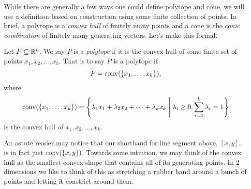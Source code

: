 \documentclass[12pt,oneside]{../../sfsuthesis}
\begin{document}
While there are generally a few ways one could define polytope and cone, we will use a definition based on construction using some finite collection of points.
In brief, a polytope is a \emph{convex hull} of finitely many points and a cone is the \emph{conic combination} of finitely many generating vectors.
Let's make this formal.
\begin{definition}[Polytope]\label{def:polytope}
    Let \( P \subseteq \mathbb{R}^n \).
    We say \( P \) is a \emph{polytope} if it is the convex hull of some finite set of points \( x_1, x_2, \dots, x_k \).
    That is to say \( P \) is a polytope if
    \[
        P = \operatorname{conv}(\{x_1, \dots, x_k\}),
    \]
    where
    \[
        \operatorname{conv}(\{x_1, \dots, x_k\}) = \left\{ \lambda_1 x_1 + \lambda_2 x_2 + \cdots + \lambda_k x_k \; \middle| \; \lambda_i \geq 0, \sum_{i=0}^k \lambda_i = 1 \right\}
    \]
    is the convex hull of \( x_1, x_2, \dots, x_k \).
\end{definition}
An astute reader may notice that our shorthand for line segment above, \( [x, y] \), is in fact just \( \operatorname{conv}(\{x,y\}) \).
Towards some intuition, we may think of the convex hull as the smallest convex shape that contains all of its generating points.
In 2 dimensions we like to think of this as stretching a rubber band around a bunch of points and letting it constrict around them.
\end{document}
